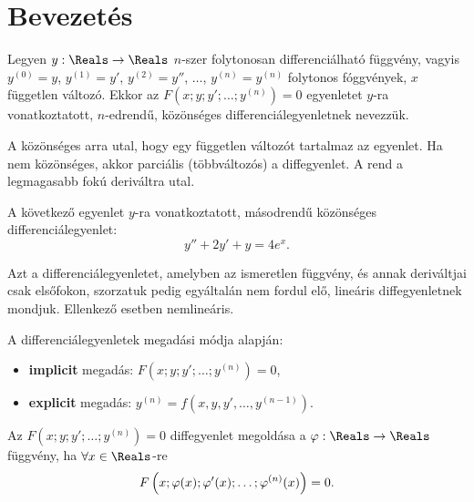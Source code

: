 \clearpage
\section{Bevezetés}

\begin{definition}[Differenciálegyenlet]
  Legyen $y : \Reals \rightarrow \Reals$ $n$-szer folytonosan differenciálható
  függvény, vagyis $y^{(0)} = y$, $y^{(1)} = y'$, $y^{(2)} = y''$, $\dots$,
  $y^{(n)} = y^{(n)}$ folytonos fóggvények, $x$ független változó. Ekkor az
  $F \left( x ; y ; y' ; \dots ; y^{(n)} \right) = 0$ egyenletet $y$-ra
  vonatkoztatott, $n$-edrendű, közönséges differenciálegyenletnek nevezzük.
\end{definition}

\begin{note}
  A közönséges arra utal, hogy egy független változót tartalmaz az egyenlet.
  Ha nem közönséges, akkor parciális (többváltozós) a diffegyenlet.
  A rend a legmagasabb fokú deriváltra utal.
\end{note}

\begin{example}
  A következő egyenlet $y$-ra vonatkoztatott, másodrendű közönséges
  differenciálegyenlet:
  \begin{equation*}
    y'' + 2y' + y = 4e^x.
  \end{equation*}
\end{example}

\begin{definition}
  Azt a differenciálegyenletet, amelyben az ismeretlen függvény, és annak
  deriváltjai csak elsőfokon, szorzatuk pedig egyáltalán nem fordul elő,
  lineáris diffegyenletnek mondjuk. Ellenkező esetben nemlineáris.
\end{definition}

\begin{note}
  A differenciálegyenletek megadási módja alapján:
  \begin{itemize}
    \item \textbf{implicit} megadás:
          $F \left( x ; y ; y' ; \dots ; y^{(n)} \right) = 0$,

    \item \textbf{explicit} megadás:
          $y^{(n)} = f(x, y, y', \dots, y^{(n-1)})$.
  \end{itemize}
\end{note}

\begin{definition}
  Az $F \left( x ; y ; y' ; \dots ; y^{(n)} \right) = 0$ diffegyenlet megoldása
  a $\varphi : \Reals \rightarrow \Reals$ függvény, ha
  $\forall x \in \Reals$-re
  $$
    F \left( x ; \varphi(x) ; \varphi'(x) ; \dots ; \varphi^{(n)}(x) \right) = 0
    \text.
  $$
\end{definition}

